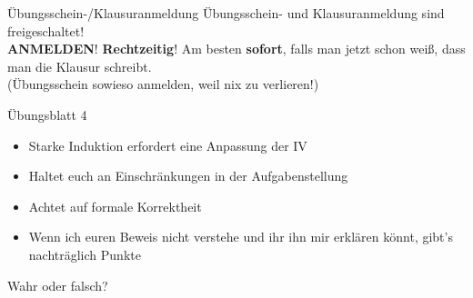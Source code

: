 



\morescalingdelimiters





\begin{frame}{Übungsschein-/Klausuranmeldung}
	\centering \Large Übungsschein- und Klausuranmeldung sind freigeschaltet! \\
	\bigskip
	\Impl \textbf{ANMELDEN}! \textbf{Rechtzeitig}! Am besten \textbf{sofort}, falls man jetzt schon weiß, dass man die Klausur schreibt. \\
	\bigskip
	(Übungsschein sowieso anmelden, weil nix zu verlieren!)
\end{frame}

\begin{frame}{Übungsblatt 4}
	\begin{itemize}
		\item Starke Induktion erfordert eine Anpassung der IV\pause
		\item Haltet euch an Einschränkungen in der Aufgabenstellung\pause
		\item Achtet auf formale Korrektheit\pause
		\item Wenn ich euren Beweis nicht verstehe und ihr ihn mir erklären könnt, gibt's nachträglich Punkte
	\end{itemize}
\end{frame}

\framePrevEpisode

\begin{frame}[t]{Wahr oder falsch?} 
		
		\Socrative
\end{frame}



